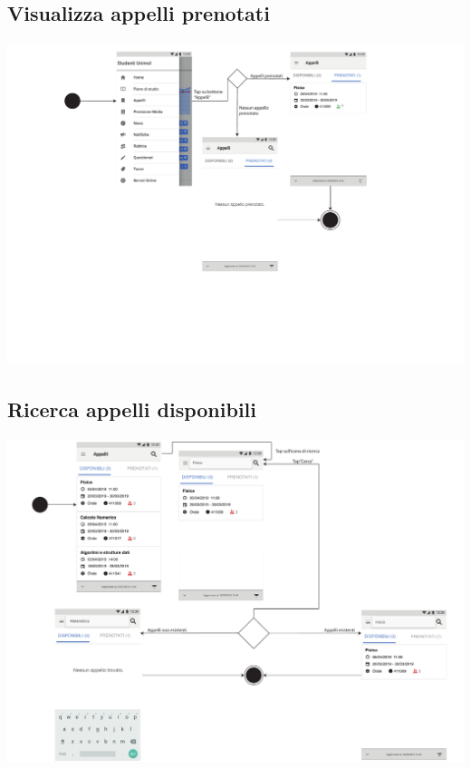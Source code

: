 
\subsection{Visualizza appelli prenotati}
\begin{center}
	\includegraphics[width=6in]{imgs/gruppo1/activity_diagrams/AD7_visualizza_appelli_prenotati.pdf}
\end{center}
\newpage


\subsection{Ricerca appelli disponibili}
\begin{center}
	\includegraphics[width=6in]{imgs/gruppo1/activity_diagrams/AD8_Ricerca_appelli.pdf}
\end{center}
\newpage

